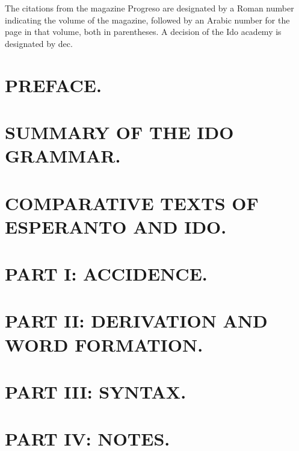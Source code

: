 \documentclass{book}
\begin{document}


\tableofcontents

The citations from the magazine Progreso are designated by a Roman number indicating the volume of the magazine, followed by an Arabic number for the page in that volume, both in parentheses. A decision of the Ido academy is designated by dec.

\section*{PREFACE.}


\section*{SUMMARY OF THE IDO GRAMMAR.}


\section*{COMPARATIVE TEXTS OF ESPERANTO AND IDO.}


\section*{PART I: ACCIDENCE.}


\section*{PART II: DERIVATION AND WORD FORMATION.}


\section*{PART III: SYNTAX.}


\section*{PART IV: NOTES.}

\end{document}
